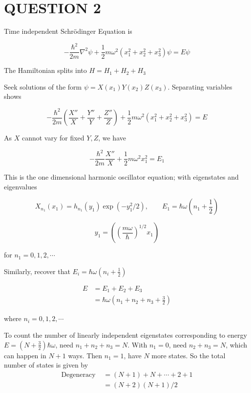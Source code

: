 \documentclass[a4paper]{article}
\begin{document}
\section{QUESTION 2}

Time independent Schr\"odinger Equation is 


\[ - \frac{\hbar^{2}}{2m} \nabla^{2} \psi  + \frac{1}{2} m \omega^{2} (x_{1}^{2} + x_{2}^{2} + x_{3}^{2}) \psi  = E \psi \]

The Hamiltonian splits into $ H = H_{1} + H_{2} + H_{3} $

Seek solutions of the form $ \psi = X(x_{1})Y(x_{2})Z(x_{3}) $.
Separating variables shows

\[  - \frac{\hbar^{2}}{2m} \left(  \frac{X''}{X} +  \frac{Y''}{Y} +  \frac{Z''}{Z} \right)  + \frac{1}{2} m \omega^{2} (x_{1}^{2} + x_{2}^{2} + x_{3}^{2}) = E  \]


As $ X $ cannot vary for fixed $ Y,Z $, we have

\[ - \frac{\hbar^{2}}{2m} \frac{X''}{X}  + \frac{1}{2} m \omega^{2} x_{1}^{2}  = E_{1} \]

This is the one dimensional harmonic oscillator equation; with eigenstates and eigenvalues

\[ X_{n_{1}}(x_{1}) = h_{n_{1}}(y_{1})   \exp \left(   - y_{1}^{2}/2 \right), \qquad E_{1} = \hbar \omega (n_{1} + \frac{1}{2})    \]

\[ y_{1} = \left( \left(  \frac{m \omega}{\hbar}  \right)^{1/2} x_{1} \right) \]

for $ n_{1} = 0,1,2,\cdots $

Similarly, recover that $ E_{i} = \hbar \omega (n_{i} + \frac{1}{2}) $

\begin{align*}
 E &= E_{1} + E_{2} + E_{3} \\
& = \hbar \omega \left(     n_{1} + n_{2} + n_{3} + \frac{3}{2} \right)
\end{align*}

where $ n_{i} = 0,1,2,\cdots $


To count the number of linearly independent eigenstates corresponding to energy $ E = (N + \frac{3}{2} ) \hbar \omega $, need $ n_{1} + n_{2} + n_{3} = N $. With $ n_{1} = 0 $, need $ n_{2} + n_{3} = N $, which can happen in $ N + 1 $ ways. Then $ n_{1} = 1 $, have $ N $ more states. So the total number of states is given by
\begin{align*}
\text{Degeneracy }& = (N + 1) + N + \cdots + 2 + 1  \\
& = (N + 2)(N + 1)/2
\end{align*}
\end{document}
